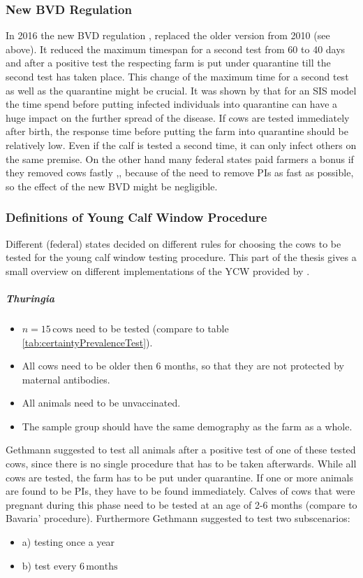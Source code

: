 \subsubsection{New BVD Regulation}\label{chap:newBVDRegulationDesc}
In 2016 the new BVD regulation \citep{bvdverordnungaenderung},\citep{bvdvonew} replaced the older version from 2010 (see above). It reduced the maximum timespan for a second test from 60 to 40 days and after a positive test the respecting farm is put under quarantine till the second test has taken place. This change of the maximum time for a second test as well as the quarantine might be crucial. It was shown by \citep{pereira2015control} that for an SIS model the time spend before putting infected individuals into quarantine can have a huge impact on the further spread of the disease. If cows are tested immediately after birth, the response time before putting the farm into quarantine should be relatively low. Even if the calf is tested a second time, it can only infect others on the same premise.
On the other hand many federal states paid farmers a bonus if they removed cows fastly \citep{bvdvorheinlandpfold},\citep{personalCom}, because of the need to remove PIs as fast as possible, so the effect of the new BVD might be negligible.
\subsubsection{Definitions of Young Calf Window Procedure}\label{chap:ycwdef}
Different (federal) states decided on different rules for choosing the cows to be tested for the young calf window testing procedure. This part of the thesis gives a small overview on different implementations of the YCW provided by \citep{personalCom}.
\subparagraph{Thuringia}\label{chap:stratThuringia}
\begin{itemize}
\item $n = 15\,\text{cows}$ need to be tested (compare to table \ref{tab:certaintyPrevalenceTest}).
\item All cows need to be older then 6 months, so that they are not protected by maternal antibodies.
\item All animals need to be unvaccinated.
\item The sample group should have the same demography as the farm as a whole.
\end{itemize}
Gethmann suggested to test all animals after a positive test of one of these tested cows, since there is no single procedure that has to be taken afterwards. While all cows are tested, the farm has to be put under quarantine. If one or more animals are found to be PIs, they have to be found immediately. Calves of cows that were pregnant during this phase need to be tested at an age of 2-6 months (compare to Bavaria' procedure). Furthermore Gethmann suggested to test two subscenarios:
\begin{itemize}
\item a) testing once a year
\item b) test every $6\,\text{months}$
\end{itemize}

